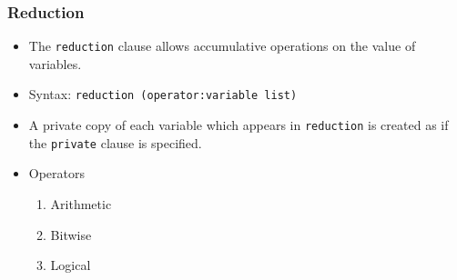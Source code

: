 \documentclass[slidestop,mathserif,compress,xcolor=svgnames]{beamer}
\begin{document}
\begin{frame}
  \frametitle{\small Reduction}
  \begin{itemize}
    \item The \texttt{reduction} clause allows accumulative operations on the value of variables.
    \item Syntax: \texttt{reduction (operator:variable list)}
    \item A private copy of each variable which appears in \texttt{reduction} is created as if the \texttt{private} clause is specified.
    \item Operators
    \begin{enumerate}
      \item Arithmetic
      \item Bitwise
      \item Logical
    \end{enumerate}
  \end{itemize}
\end{frame}
\end{document}
